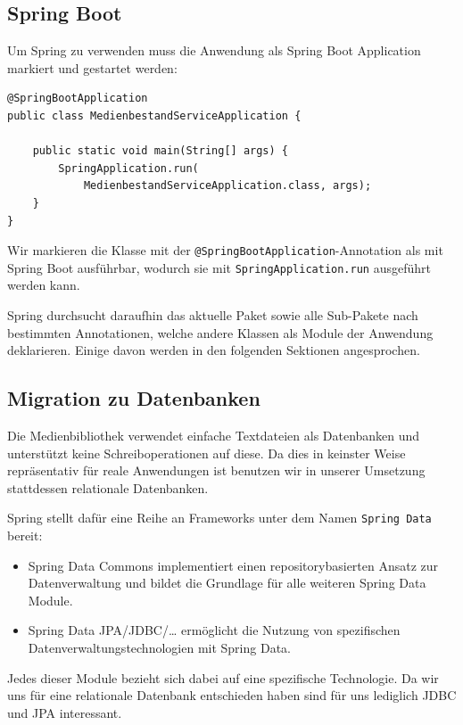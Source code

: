 \documentclass{article}
\begin{document}
\subsection{Spring Boot}

Um Spring zu verwenden muss die Anwendung als Spring Boot Application markiert und gestartet werden:

\begin{lstlisting}
@SpringBootApplication
public class MedienbestandServiceApplication {

    public static void main(String[] args) {
        SpringApplication.run(
        	MedienbestandServiceApplication.class, args);
    }
}
\end{lstlisting}

Wir markieren die Klasse mit der \texttt{@SpringBootApplication}-Annotation als mit Spring Boot ausführbar, wodurch sie mit \texttt{SpringApplication.run} ausgeführt werden kann.

Spring durchsucht daraufhin das aktuelle Paket sowie alle Sub-Pakete nach bestimmten Annotationen, welche andere Klassen als Module der Anwendung deklarieren.
Einige davon werden in den folgenden Sektionen angesprochen.

\subsection{Migration zu Datenbanken}

Die Medienbibliothek verwendet einfache Textdateien als Datenbanken und unterstützt keine Schreiboperationen auf diese.
Da dies in keinster Weise repräsentativ für reale Anwendungen ist benutzen wir in unserer Umsetzung stattdessen relationale Datenbanken.

Spring stellt dafür eine Reihe an Frameworks unter dem Namen \texttt{Spring Data} bereit:
\begin{itemize}
        \item{Spring Data Commons} {implementiert einen repositorybasierten Ansatz zur Datenverwaltung und bildet die Grundlage für alle weiteren Spring Data Module.}
        \item{Spring Data JPA/JDBC/\ldots} ermöglicht die Nutzung von spezifischen Datenverwaltungstechnologien mit Spring Data.
\end{itemize}

Jedes dieser Module bezieht sich dabei auf eine spezifische Technologie.
Da wir uns für eine relationale Datenbank entschieden haben sind für uns lediglich JDBC und JPA interessant.
\end{document}
